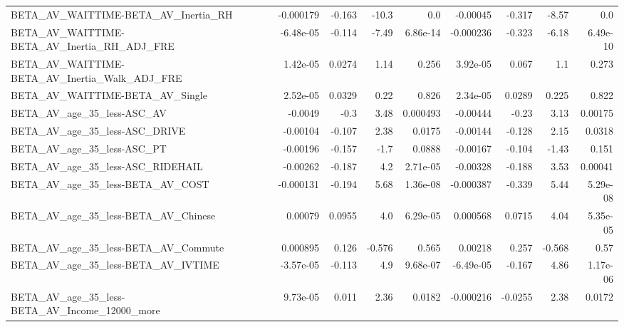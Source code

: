 \begin{tabular}{lrrrrrrrr}
BETA\_AV\_WAITTIME-BETA\_AV\_Inertia\_RH                &   -0.000179 &       -0.163 &    -10.3 &      0.0 &   -0.00045 &      -0.317 &        -8.57 &           0.0 \\
BETA\_AV\_WAITTIME-BETA\_AV\_Inertia\_RH\_ADJ\_FRE        &   -6.48e-05 &       -0.114 &    -7.49 & 6.86e-14 &  -0.000236 &      -0.323 &        -6.18 &      6.49e-10 \\
BETA\_AV\_WAITTIME-BETA\_AV\_Inertia\_Walk\_ADJ\_FRE      &    1.42e-05 &       0.0274 &     1.14 &    0.256 &   3.92e-05 &       0.067 &          1.1 &         0.273 \\
BETA\_AV\_WAITTIME-BETA\_AV\_Single                    &    2.52e-05 &       0.0329 &     0.22 &    0.826 &   2.34e-05 &      0.0289 &        0.225 &         0.822 \\
BETA\_AV\_age\_35\_less-ASC\_AV                         &     -0.0049 &         -0.3 &     3.48 & 0.000493 &   -0.00444 &       -0.23 &         3.13 &       0.00175 \\
BETA\_AV\_age\_35\_less-ASC\_DRIVE                      &    -0.00104 &       -0.107 &     2.38 &   0.0175 &   -0.00144 &      -0.128 &         2.15 &        0.0318 \\
BETA\_AV\_age\_35\_less-ASC\_PT                         &    -0.00196 &       -0.157 &     -1.7 &   0.0888 &   -0.00167 &      -0.104 &        -1.43 &         0.151 \\
BETA\_AV\_age\_35\_less-ASC\_RIDEHAIL                   &    -0.00262 &       -0.187 &      4.2 & 2.71e-05 &   -0.00328 &      -0.188 &         3.53 &       0.00041 \\
BETA\_AV\_age\_35\_less-BETA\_AV\_COST                   &   -0.000131 &       -0.194 &     5.68 & 1.36e-08 &  -0.000387 &      -0.339 &         5.44 &      5.29e-08 \\
BETA\_AV\_age\_35\_less-BETA\_AV\_Chinese                &     0.00079 &       0.0955 &      4.0 & 6.29e-05 &   0.000568 &      0.0715 &         4.04 &      5.35e-05 \\
BETA\_AV\_age\_35\_less-BETA\_AV\_Commute                &    0.000895 &        0.126 &   -0.576 &    0.565 &    0.00218 &       0.257 &       -0.568 &          0.57 \\
BETA\_AV\_age\_35\_less-BETA\_AV\_IVTIME                 &   -3.57e-05 &       -0.113 &      4.9 & 9.68e-07 &  -6.49e-05 &      -0.167 &         4.86 &      1.17e-06 \\
BETA\_AV\_age\_35\_less-BETA\_AV\_Income\_12000\_more      &    9.73e-05 &        0.011 &     2.36 &   0.0182 &  -0.000216 &     -0.0255 &         2.38 &        0.0172 \\

\end{tabular}
